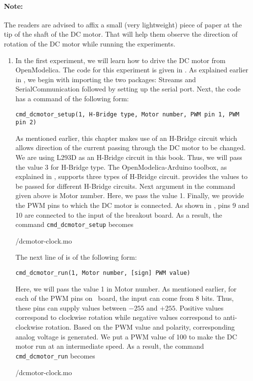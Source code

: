 \paragraph{Note:} The readers are advised to affix a small 
(very lightweight) piece of paper at the tip of the shaft of the DC motor. 
That will help them observe the direction of rotation 
of the DC motor while running the experiments.

\begin{enumerate}
  \item In the first experiment, we will learn how to drive the DC motor
        from OpenModelica. The code for this experiment is 
        given in  . 
        As explained earlier in , 
        we begin with importing the two packages: Streams and SerialCommunication followed 
        by setting up the serial port. Next, the code has a command of the following form: 
        \begin{lstlisting}[style=nonumbers]
          cmd_dcmotor_setup(1, H-Bridge type, Motor number, PWM pin 1, PWM pin 2)
        \end{lstlisting}
        As mentioned earlier, this chapter makes use of an H-Bridge circuit which 
        allows direction of the current passing through the DC motor to be changed.
        We are using L293D as an H-Bridge circuit in this book. Thus, we will pass the value 3 for
        H-Bridge type. The OpenModelica-Arduino toolbox, as explained in 
        , 
        supports three types of H-Bridge circuit. 
        provides the values to be passed for different H-Bridge circuits. 
        Next argument in the command given above is Motor number. Here, we pass the value 1. 
        Finally, we provide the PWM pins to which the DC motor is connected. As 
        shown in , pins 9 and 10 are connected to the
        input of the breakout board. As a result, the command {\tt cmd\_dcmotor\_setup} becomes
        
        {\LocDCMOpenModelicacode/dcmotor-clock.mo}
        
        The next line of  is of the following form: 
        \begin{lstlisting}[style=nonumbers]
          cmd_dcmotor_run(1, Motor number, [sign] PWM value)
        \end{lstlisting}
        Here, we will pass the value 1 in Motor number.  As mentioned earlier, 
        for each of the PWM pins on \arduino\ board, the input can come from 8 bits.
        Thus, these pins can supply values between $- 255$ and $+ 255$. Positive values correspond to clockwise
        rotation while negative values correspond to anti-clockwise rotation. Based on the PWM value and polarity, 
        corresponding analog voltage is generated.  
        We put a PWM value of 100 to make the DC motor run at an intermediate speed.  
        As a result, the command {\tt cmd\_dcmotor\_run} becomes
        
        {\LocDCMOpenModelicacode/dcmotor-clock.mo}
        

\end{enumerate}
